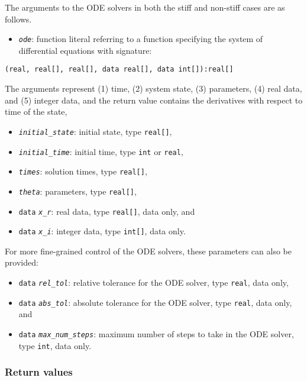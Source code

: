 \documentclass[
  10pt,
]{book}
\providecommand{\tightlist}{%
  \setlength{\itemsep}{0pt}\setlength{\parskip}{0pt}}
\begin{document}
The arguments to the ODE solvers in both the stiff and non-stiff cases
are as follows.

\begin{itemize}
\tightlist
\item
  \emph{\texttt{ode}}: function literal referring to a function specifying the
  system of differential equations with signature:
\end{itemize}

\begin{verbatim}
(real, real[], real[], data real[], data int[]):real[]
\end{verbatim}

The arguments represent (1) time, (2) system state, (3) parameters,
(4) real data, and (5) integer data, and the return value contains the
derivatives with respect to time of the state,

\begin{itemize}
\item
  \emph{\texttt{initial\_state}}: initial state, type \texttt{real{[}{]}},
\item
  \emph{\texttt{initial\_time}}: initial time, type \texttt{int} or \texttt{real},
\item
  \emph{\texttt{times}}: solution times, type \texttt{real{[}{]}},
\item
  \emph{\texttt{theta}}: parameters, type \texttt{real{[}{]}},
\item
  \texttt{data} \emph{\texttt{x\_r}}: real data, type \texttt{real{[}{]}}, data only, and
\item
  \texttt{data} \emph{\texttt{x\_i}}: integer data, type \texttt{int{[}{]}}, data only.
\end{itemize}

For more fine-grained control of the ODE solvers, these parameters can
also be provided:

\begin{itemize}
\item
  \texttt{data} \emph{\texttt{rel\_tol}}: relative tolerance for the ODE solver, type
  \texttt{real}, data only,
\item
  \texttt{data} \emph{\texttt{abs\_tol}}: absolute tolerance for the ODE solver, type
  \texttt{real}, data only, and
\item
  \texttt{data} \emph{\texttt{max\_num\_steps}}: maximum number of steps to take in the
  ODE solver, type \texttt{int}, data only.
\end{itemize}

\hypertarget{return-values-1}{%
\subsubsection{Return values}\label{return-values-1}}
\end{document}
